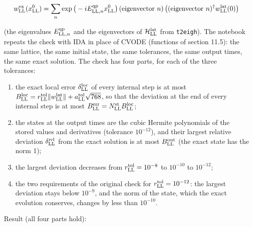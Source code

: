 \documentclass[
  10pt,
]{article}
\providecommand{\tightlist}{%
  \setlength{\itemsep}{0pt}\setlength{\parskip}{0pt}}
\begin{document}
\[w^{\rm ex}_{\rm LL}(x^0_{\rm LL})=\sum_n\exp\big(-iE^{\rm qp}_{{\rm LL},n}x^0_{\rm LL}\big)\,(\text{eigenvector }n)\,\big((\text{eigenvector }n)^\dagger w^{\rm lat}_{\rm LL}(0)\big)\]

(the eigenvalues \(E^{\rm qp}_{{\rm LL},n}\) and the eigenvectors of
\(\mathcal H^{\rm lat}_{\rm LL}\) from \texttt{t2eigh}). The notebook
repeats the check with IDA in place of CVODE (functions of section
11.5): the same lattice, the same initial state, the same tolerances,
the same output times, the same exact solution. The check has four
parts, for each of the three tolerances:

\begin{enumerate}
\def\labelenumi{\arabic{enumi}.}
\tightlist
\item
  the exact local error \(\delta^{\rm loc}_{\rm LL}\) of every internal
  step is at most
  \(B^{\rm loc}_{\rm LL}=r^{\rm tol}_{\rm LL}\lVert w^{\rm lat}_{\rm LL}\rVert+a^{\rm tol}_{\rm LL}\sqrt{768}\),
  so that the deviation at the end of every internal step is at most
  \(B^{\rm err}_{\rm LL}=N^{\rm st}_{\rm LL}B^{\rm loc}_{\rm LL}\);
\item
  the states at the output times are the cubic Hermite polynomials of
  the stored values and derivatives (tolerance \(10^{-12}\)), and their
  largest relative deviation \(\delta^{\rm rel}_{\rm LL}\) from the
  exact solution is at most \(B^{\rm out}_{\rm LL}\) (the exact state
  has the norm 1);
\item
  the largest deviation decreases from \(r^{\rm tol}_{\rm LL}=10^{-8}\)
  to \(10^{-10}\) to \(10^{-12}\);
\item
  the two requirements of the original check for
  \(r^{\rm tol}_{\rm LL}=10^{-12}\): the largest deviation stays below
  \(10^{-9}\), and the norm of the state, which the exact evolution
  conserves, changes by less than \(10^{-10}\).
\end{enumerate}

Result (all four parts hold):
\end{document}
